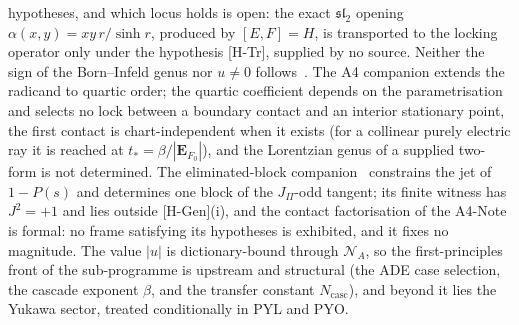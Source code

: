 \documentclass[11pt,a4paper]{article}
\begin{document}
    hypotheses, and which locus holds is open: the exact $\mathfrak{sl}_2$ opening
    $\alpha(x,y) = xy\,r/\sinh r$, produced by $[E,F]=H$, is transported to the locking operator only under the
    hypothesis [H-Tr], supplied by no source.
    Neither the sign of the Born--Infeld genus nor $u \neq 0$ follows~\cite{Beau2026bim}.
    The A4 companion extends the radicand to quartic order; the quartic coefficient depends on the parametrisation and
    selects no lock between a boundary contact and an interior stationary point, the first contact is
    chart-independent when it exists (for a collinear purely electric ray it is reached at
    $t_* = \beta/|\mathbf{E}_{F_0}|$), and the Lorentzian genus of a supplied two-form is not determined.
    The eliminated-block companion~\cite{Beau2026ebj} constrains the jet of $1-P(s)$ and determines one block
    of the $J_\Pi$-odd tangent; its finite witness has $J^2 = +1$ and lies outside [H-Gen](i), and the contact
    factorisation of the A4-Note is formal: no frame satisfying its hypotheses is exhibited, and it fixes no
    magnitude.
    The value $|u|$ is dictionary-bound through $\mathcal{N}_A$, so the first-principles front of the
    sub-programme is upstream and structural (the ADE case selection, the cascade exponent $\beta$, and the
    transfer constant $N_{\mathrm{casc}}$), and beyond it lies the Yukawa sector, treated conditionally in PYL and PYO.
\end{document}
